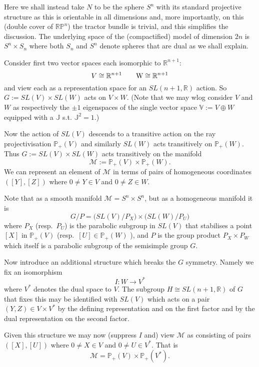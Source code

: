 Here we shall instead take $N$ to be the sphere $S^n$ with its standard
projective structure as this is orientable in all dimensions and, more
importantly, on this (double cover of $\mathbb{R}\mathbb{P}^n$) the
tractor bundle is trivial, and this simplifies the discussion.  The
underlying space of the (compactified) model of dimension $2n$ is
$S^n\times S_n$ where both $S_n$ and $S^n$ denote spheres that are
dual as we shall explain.

Consider first two vector spaces each isomorphic to $\mathbb{R}^{n+1}$:
$$
V\cong \mathbb{R}^{n+1} \qquad \mbox W \cong \mathbb{R}^{n+1}
$$
and view each as a representation space for an $SL(n+1,\mathbb{R})$
action.  So $G:= SL(V)\times SL(W)$ acts on $V\times W$. (Note that we may
wlog consider $V$ and $W$ as respectively the $\pm 1$ eigenspaces of
the single vector space $\mathbb{V}:=V\oplus W$ equipped with a
$\mathbb{J}$ s.t. $\mathbb{J}^2=1$.)

Now the action of $SL(V)$ descends to a transitive action on the ray
projectivisation $\mathbb{P}_+(V)$ and similarly $SL(W)$ acts
transitively on $\mathbb{P}_+(W)$. Thus  $G:= SL(V)\times SL(W)$ acts transitively on the manifold
$$
{\mathcal M}:= \mathbb{P}_+(V) \times \mathbb{P}_+(W).
$$
We can represent an element of $\mathcal{M}$ in terms of pairs of homogeneous coordinates
$([Y],[Z])$ where $0\neq Y\in V$ and $0\neq Z\in W$.

Note that as a smooth manifold $\mathcal{M}=S^n\times S^n$, but as a homogeneous manifold it is
$$
G/P = \big( SL(V)/P_X \big)\times \big( SL(W)/P_U \big)
$$
where $P_X$ (resp.\ $P_U$) is the parabolic subgroup in $SL(V)$
that stabilises a point $[X]$ in $\mathbb{P}_+(V)$ (resp.\ $[U] \in \mathbb{P}_+(W)$
), and $P$ is the group product $P_X\times P_W$ which itself is a
parabolic subgroup of the semisimple group $G$.

Now introduce an additional structure which breaks the $G$
symmetry. 
Namely we fix an isomorphism
$$
I:W\to V^*
$$
where $V^*$ denotes the dual space to $V$. The subgroup $H\cong SL(n+1,\mathbb{R})$ of $G$
that fixes this may be identified with $SL(V)$ which acts on a pair
$(Y,Z)\in V\times V^*$ by the defining representation and on the first
factor and by the dual representation on the second factor.

Given this structure we may now (suppress $I$ and) view ${\mathcal{M}}$ as
consisting of pairs $([X],[U])$ where $0\neq X\in V$ and $0\neq U\in
V^*$. That is 
$$
{\mathcal{M}}= \mathbb{P}_+(V) \times \mathbb{P}_+(V^*).
$$

